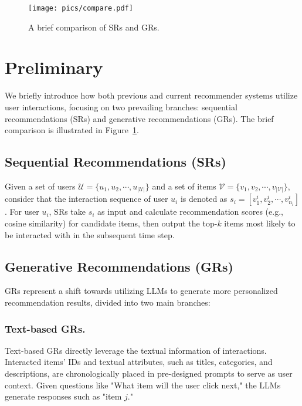 \begin{figure}[t]
    \centering
    \texttt{[image: pics/compare.pdf]}
    \caption{
    A brief comparison of SRs and GRs.
    }
    \label{fig:compare}
    \vspace{-2mm}
\end{figure}


\section{Preliminary}
We briefly introduce how both previous and current recommender systems utilize user interactions, focusing on two prevailing branches: sequential recommendations (SRs) and generative recommendations (GRs). The brief comparison is illustrated in Figure~\ref{fig:compare}.

\subsection{Sequential Recommendations (SRs)}
Given a set of users \(\mathcal{U}=\{u_1,u_2,\cdots,u_{\vert\mathcal{U}\vert}\}\) and a set of items \(\mathcal{V}=\{v_1,v_2,\cdots,v_{\vert\mathcal{V}\vert}\}\), consider that the interaction sequence of user \(u_i\) is denoted as \(s_i=[v_{1}^i, v_{2}^i, \cdots, v_{n_i}^i]\). For user \(u_i\), SRs take \(s_i\) as input and calculate recommendation scores (e.g., cosine similarity) for candidate items, then output the top-\(k\) items most likely to be interacted with in the subsequent time step.

\subsection{Generative Recommendations (GRs)}
GRs represent a shift towards utilizing LLMs to generate more personalized recommendation results, divided into two main branches:

\subsubsection{\textbf{Text-based GRs.}} 
Text-based GRs directly leverage the textual information of interactions. Interacted items' IDs and textual attributes, such as titles, categories, and descriptions, are chronologically placed in pre-designed prompts to serve as user context. Given questions like "What item will the user click next," the LLMs generate responses such as "item $j$."

